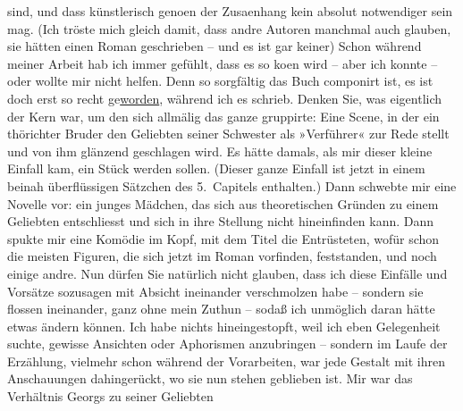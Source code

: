 \begin{ledgroupsized}[t]{13cm}
               sind, und dass künstlerisch geno{\geminationm}en der Zusa{\geminationm}enhang kein absolut notwendiger sein mag. (Ich tröste
               mich gleich damit, dass andre Autoren manchmal auch glauben, sie hätten einen Roman
               geschrieben – und es ist gar keiner) Schon während meiner Arbeit hab ich immer
               gefühlt, dass es so ko{\geminationm}en wird – aber ich konnte – oder
               wollte mir nicht helfen. Denn so sorgfältig das Buch componirt ist, es ist doch erst
               so recht ge{\pb}\uline{worden}, während ich es schrieb. Denken Sie, was
               eigentlich der Kern war, um den sich allmälig das ganze gruppirte: Eine Scene, in der
               ein thörichter Bruder den Geliebten seiner Schwester als »Verführer« zur Rede stellt
               und von ihm glänzend geschlagen wird. Es hätte damals, als mir dieser kleine Einfall
               kam, ein Stück werden sollen. (Dieser ganze Einfall ist jetzt in einem beinah
               überflüssigen Sätzchen des 5. Capitels enthalten.) Dann schwebte mir eine Novelle
               vor: ein junges Mädchen, das sich aus theoretischen Gründen zu einem Geliebten
               entschliesst und sich in ihre Stellung nicht hineinfinden kann. Dann spukte mir eine
               Komödie im Kopf, mit dem Titel {\pb}die Entrüsteten, wofür schon die
               meisten Figuren, die sich jetzt im Roman vorfinden, feststanden, und noch einige
               andre. Nun dürfen Sie natürlich nicht glauben, dass ich diese Einfälle und Vorsätze
               sozusagen mit Absicht ineinander verschmolzen habe – sondern sie flossen ineinander,
               ganz ohne mein Zuthun – sodaß ich unmöglich daran hätte etwas ändern können. Ich habe
               nichts hineingestopft, weil ich eben Gelegenheit suchte, gewisse Ansichten oder
               Aphorismen anzubringen – sondern im Laufe der Erzählung, vielmehr schon während der
               Vorarbeiten, war jede Gestalt mit ihren Anschauungen dahingerückt, wo sie nun stehen
               geblieben ist. Mir war {\pb}das Verhältnis Georgs zu seiner Geliebten

\end{ledgroupsized}
